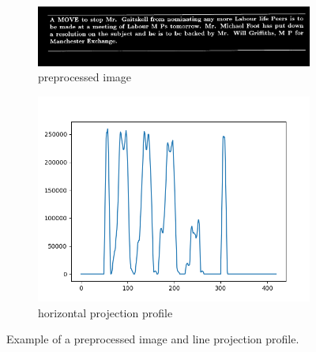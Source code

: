 \documentclass[english, paper=a4]{scrartcl}
\begin{document}
\begin{figure}
	\centering
	\begin{subfigure}{0.40\textwidth}
		\includegraphics[width=\textwidth]{PreprocessedImg.PNG}
		\caption{preprocessed image}
		\label{fig:ex2a}
	\end{subfigure}
	\begin{subfigure}{0.40\textwidth}
		\includegraphics[width=\textwidth]{HorzProjection.PNG}
		\caption{horizontal projection profile}
		\label{fig:ex2b}
	\end{subfigure}
	\caption{Example of a preprocessed image and line projection profile.}
	\label{fig:ex_proj_horz}
\end{figure}
\end{document}

